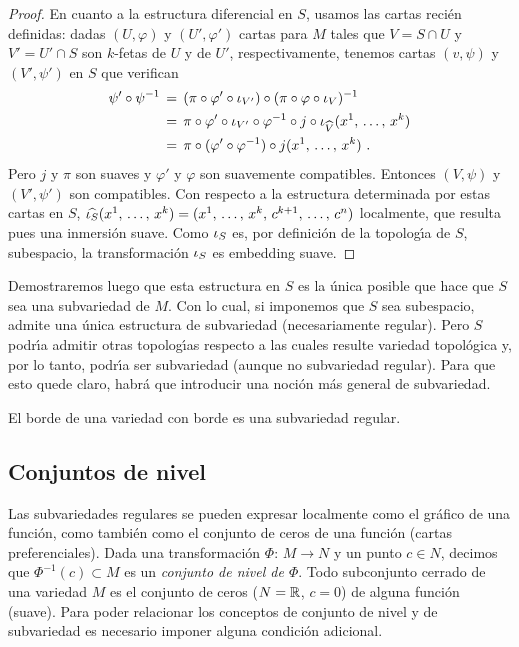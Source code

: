 \begin{proof}
	En cuanto a la estructura diferencial en $S$, usamos las cartas
	reci\'{e}n definidas: dadas $(U,\varphi)$ y $(U',\varphi')$ cartas
	para $M$ tales que $V=S\cap U$ y $V'=U'\cap S$ son $k$-fetas
	de $U$ y de $U'$, respectivamente, tenemos cartas
	$(v,\psi)$ y $(V',\psi')$ en $S$ que verifican
	\begin{align*}
		\psi'\circ\psi^{-1} & \,=\, (\pi\circ\varphi'\circ\inc[V'])
			\circ (\pi\circ\varphi\circ\inc[V])^{-1} \\
		& \,=\, \pi\circ\varphi'\circ\inc[V']\circ\varphi^{-1}
			\circ j\circ\inc[\widehat{V}](\lista*{x}{k}) \\
		& \,=\,\pi\circ (\varphi'\circ\varphi^{-1})\circ
			j(\lista*{x}{k})
		\text{ .}
	\end{align*}
	Pero $j$ y $\pi$ son suaves y $\varphi'$ y $\varphi$ son suavemente
	compatibles. Entonces $(V,\psi)$ y $(V',\psi')$ son compatibles.
	Con respecto a la estructura determinada por estas cartas en $S$,
	$\widehat{\inc[S]}(\lista*{x}{k})=%
	(\lista*{x}{k},\,c^{k+1},\,\dots,\,c^{n})$ localmente, que resulta
	pues una inmersi\'{o}n suave. Como $\inc[S]$ es, por definici\'{o}n
	de la topolog\'{\i}a de $S$, subespacio, la transformaci\'{o}n
	$\inc[S]$ es embedding suave.
\end{proof}

Demostraremos luego que esta estructura en $S$ es la \'{u}nica posible que
hace que $S$ sea una subvariedad de $M$. Con lo cual, si imponemos que
$S$ sea subespacio, admite una \'{u}nica estructura de subvariedad
(necesariamente regular). Pero $S$ podr\'{\i}a admitir otras topolog\'{\i}as
respecto a las cuales resulte variedad topol\'{o}gica y, por lo tanto,
podr\'{\i}a ser subvariedad (aunque no subvariedad regular). Para que
esto quede claro, habr\'{a} que introducir una noci\'{o}n m\'{a}s general
de subvariedad.

El borde de una variedad con borde es una subvariedad regular.

\subsection{Conjuntos de nivel}
Las subvariedades regulares se pueden expresar localmente como el
gr\'{a}fico de una funci\'{o}n, como tambi\'{e}n como el conjunto de ceros
de una funci\'{o}n (cartas preferenciales). Dada una transformaci\'{o}n
$\Phi:\,M\rightarrow N$ y un punto $c\in N$, decimos que
$\Phi^{-1}(c)\subset M$ es un \emph{conjunto de nivel de $\Phi$}. Todo
subconjunto cerrado de una variedad $M$ es el conjunto de ceros
($N=\bb{R}$, $c=0$) de alguna funci\'{o}n (suave). Para poder relacionar
los conceptos de conjunto de nivel y de subvariedad es necesario imponer
alguna condici\'{o}n adicional.

